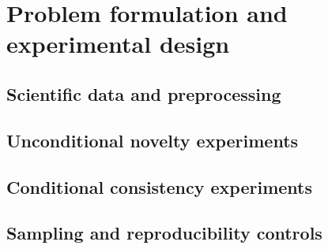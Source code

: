 \section{Problem formulation and experimental design}

\subsection{Scientific data and preprocessing}

\draftplaceholder

\subsection{Unconditional novelty experiments}

\draftplaceholder

\subsection{Conditional consistency experiments}

\draftplaceholder

\subsection{Sampling and reproducibility controls}

\draftplaceholder
